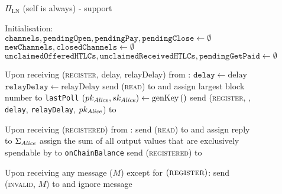 \begin{figure}[!htbp]
  \begin{protocolbox}{$\Pi_{\mathrm{LN}}$ (self is \alice{} always) - support}
    \begin{algorithmic}[1]
      \State Initialisation:
      \Indent
        \State $\mathtt{channels}, \mathtt{pendingOpen}, \mathtt{pendingPay},
        \mathtt{pendingClose} \gets \emptyset$
        \State $\mathtt{newChannels}, \mathtt{closedChannels} \gets \emptyset$
        \State $\mathtt{unclaimedOfferedHTLCs}, \mathtt{unclaimedReceivedHTLCs},
        \mathtt{pendingGetPaid} \gets \emptyset$
      \EndIndent
      \State

      \State Upon receiving (\textsc{register}, delay, relayDelay) from
      \environment:
      \Indent
        \State $\mathtt{delay} \gets \mathrm{delay}$
        \label{alg:protocol:support:delay}
        \State $\mathtt{relayDelay} \gets \mathrm{relayDelay}$
        \State send (\textsc{read}) to \ledger{} and assign largest block number
        to \texttt{lastPoll}
        \label{alg:protocol:support:lastpoll}
        \State $\left(pk_{\mathit{Alice}}, sk_{\mathit{Alice}}\right) \gets
        \mathrm{genKey}\left(\right)$
        \label{alg:protocol:support:keygen}
        \State send (\textsc{register}, \alice, \texttt{delay},
        \texttt{relayDelay}, $pk_{\mathit{Alice}}$) to \environment
      \EndIndent
      \State

      \State Upon receiving (\textsc{registered}) from \environment:
      \Indent
        \State send (\textsc{read}) to \ledger{} and assign reply to
        $\Sigma_{\mathit{Alice}}$
        \State assign the sum of all output values that are exclusively
        spendable by \alice{} to \texttt{onChainBalance}
        \State send (\textsc{registered}) to \environment
      \EndIndent
      \State

      \State Upon receiving any message ($M$) except for
      $\left(\textsc{register}\right)$:
      \Indent
          \State send (\textsc{invalid}, $M$) to \environment{} and ignore
          message
        \EndIf
      \EndIndent
      \State


\end{algorithmic}
\end{protocolbox}
\end{figure}
